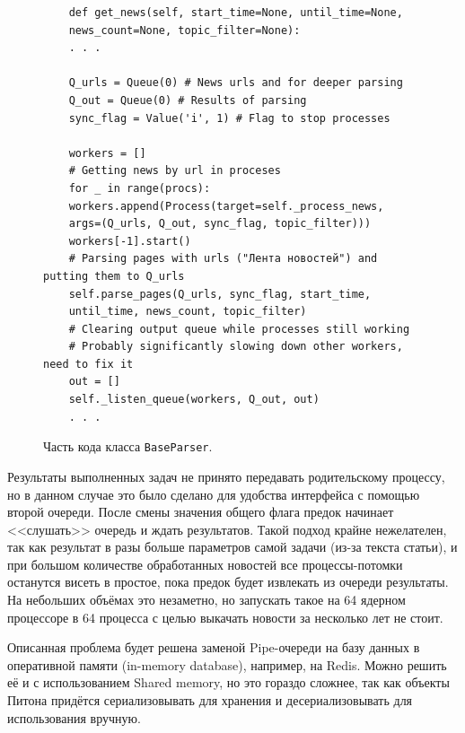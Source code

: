 \documentclass[a4paper, 14pt]{extarticle}
\begin{document}
\begin{figure}
	\centering
	\begin{verbatim}
	def get_news(self, start_time=None, until_time=None,
	news_count=None, topic_filter=None):
	. . .
	
	Q_urls = Queue(0) # News urls and for deeper parsing 
	Q_out = Queue(0) # Results of parsing
	sync_flag = Value('i', 1) # Flag to stop processes
	
	workers = []
	# Getting news by url in proceses
	for _ in range(procs):
	workers.append(Process(target=self._process_news,
	args=(Q_urls, Q_out, sync_flag, topic_filter)))
	workers[-1].start()
	# Parsing pages with urls ("Лента новостей") and putting them to Q_urls
	self.parse_pages(Q_urls, sync_flag, start_time, 
	until_time, news_count, topic_filter)
	# Clearing output queue while processes still working
	# Probably significantly slowing down other workers, need to fix it
	out = []
	self._listen_queue(workers, Q_out, out)
	. . .
	\end{verbatim}
	\caption{Часть кода класса \texttt{BaseParser}.}
	\label{getnews}
\end{figure}

Результаты выполненных задач не принято передавать родительскому процессу, но в данном случае это было сделано для удобства интерфейса с помощью второй очереди. После смены значения общего флага предок начинает <<слушать>> очередь и ждать результатов. Такой подход крайне нежелателен, так как результат в разы больше параметров самой задачи (из-за текста статьи), и при большом количестве обработанных новостей все процессы-потомки останутся висеть в простое, пока предок будет извлекать из очереди результаты. На небольших объёмах это незаметно, но запускать такое на 64 ядерном процессоре в 64 процесса с целью выкачать новости за несколько лет не стоит.

Описанная проблема будет решена заменой Pipe-очереди на базу данных в оперативной памяти (in-memory database), например, на Redis. Можно решить её и с использованием Shared memory, но это гораздо сложнее, так как объекты Питона придётся сериализовывать для хранения и десериализовывать для использования вручную.
\end{document}
